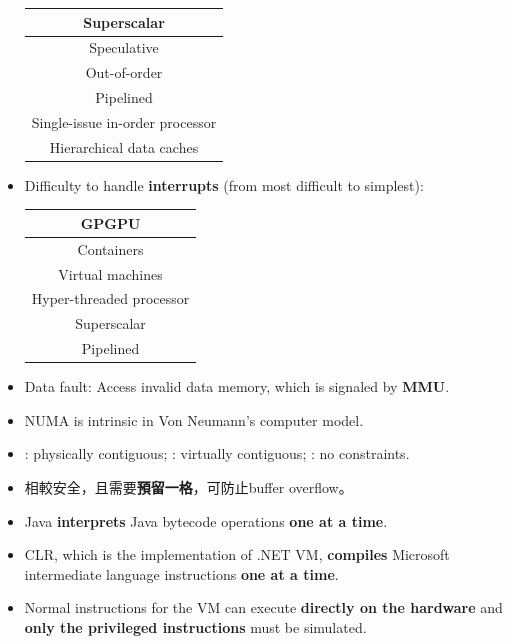 \begin{itemize}
\begin{table}[H]
        \centering
        \begin{tabular}{|c|}
            \hline
            Superscalar \\
            \hline
            Speculative \\
            \hline
            Out-of-order \\
            \hline
            Pipelined \\
            \hline
            Single-issue in-order processor \\
            \hline
            Hierarchical data caches \\
            \hline
        \end{tabular}
    \end{table}
    \item Difficulty to handle \textbf{interrupts} (from most difficult to simplest): \begin{table}[H]
        \centering
        \begin{tabular}{|c|}
            \hline
            GPGPU \\
            \hline
            Containers \\
            \hline
            Virtual machines \\
            \hline
            Hyper-threaded processor \\
            \hline
            Superscalar \\
            \hline
            Pipelined \\
            \hline
        \end{tabular}
    \end{table}
    \item Data fault: Access invalid data memory, which is signaled by \textbf{MMU}.
    \item NUMA is intrinsic in Von Neumann's computer model.
    \item {}: physically contiguous; : virtually contiguous; : no constraints.
    \item {}相較安全，且需要\textbf{預留一格}，可防止buffer overflow。
    \item Java \textbf{interprets} Java bytecode operations \textbf{one at a time}.
    \item CLR, which is the implementation of .NET VM, \textbf{compiles} Microsoft intermediate language instructions \textbf{one at a time}.
    \item Normal instructions for the VM can execute \textbf{directly on the hardware} and \textbf{only the privileged instructions} must be simulated.

\end{itemize}
